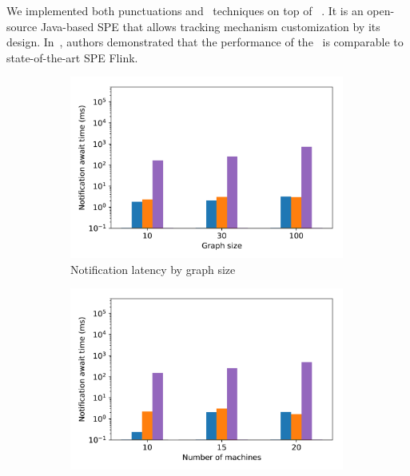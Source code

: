 We implemented both punctuations and \tracker\ techniques on top of \FlameStream~\cite{we2018beyondmr}. It is an open-source Java-based SPE that allows tracking mechanism customization by its design. In~\cite{we2018adbis}, authors demonstrated that the performance of the \FlameStream\ is comparable to state-of-the-art SPE Flink.

\begin{figure}[t!]
    \begin{subfigure}[b]{0.25\textwidth}
            \includegraphics[width=0.99\textwidth]{pics/notification_await_time_by_graph_size_bars.png}
            \caption{Notification latency by graph size}
            \label{notification_graph}
    \end{subfigure}
    \hspace{5mm}
    \begin{subfigure}[b]{0.25\textwidth}
            \includegraphics[width=0.99\textwidth]{pics/notification_await_time_by_number_of_machines_bars.png}

\end{subfigure}
\end{figure}
